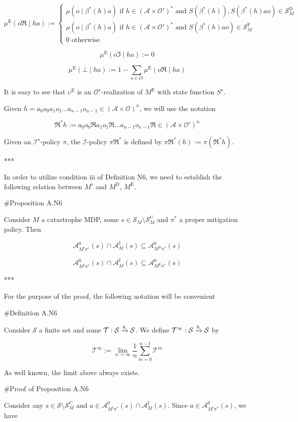 \documentclass[a4paper]{article}
\newcommand{\AP}[1]{\left(#1\right)}
\newcommand{\M}{\xrightarrow{\textnormal{k}}}
\newcommand{\Ob}{\mathcal{O}}
\newcommand{\A}{\mathcal{A}}
\newcommand{\St}{\mathcal{S}}
\newcommand{\T}{\mathcal{T}}
\newcommand{\In}{\mathcal{I}}
\newcommand{\RMC}{\mathrm{C}}
\newcommand{\RMD}{\mathrm{D}}
\newcommand{\RME}{\mathrm{E}}
\newcommand{\RMF}{\mathrm{F}}
\newcommand{\SF}{\St^{\RMF}}
\newcommand{\SD}{\St^{\RMD}}
\newcommand{\SC}{\St^{\RMC}}
\newcommand{\MD}{M^{\RMD}}
\newcommand{\ME}{M^{\RME}}
\begin{document}
$$\mu^\RME(o\Re \mid ha) := \begin{cases} \mu\AP{o \mid \beta^*(h)a} \text{ if } h\in\AP{\A \times \Ob'}^* \text{ and } S\AP{\beta^*(h)},S\AP{\beta^*(h)ao}\in\SD_M \\ \mu\AP{o \mid \beta^*(h)a} \text{ if } h\in\AP{\A \times \Ob'}^* \text{ and } S\AP{\beta^*(h)ao}\in\SF_M \\ 0 \text{ otherwise} \end{cases}$$

$$\mu^\RME(o\Im \mid ha) := 0$$

$$\mu^\RME(\bot \mid ha) := 1 - \sum_{o \in O} \mu^\RME(o\Re \mid ha)$$

It is easy to see that $\upsilon^\RME$ is an $\Ob^\star$-realization of $\ME$ with state function $S^\star$.

Given $h = a_0 o_0 a_1 o_1 \ldots a_{n-1} o_{n-1} \in \AP{\A \times \Ob}^n$, we will use the notation

$$\Re^*h := a_0 o_0 \Re a_1 o_1 \Re \ldots a_{n-1} o_{n-1} \Re \in \AP{\A \times \Ob'}^n$$ 

Given an $\In^\star$-policy $\pi$, the $\In$-policy $\pi\Re^*$ is defined by $\pi\Re^*(h) := \pi\AP{\Re^*h}$.

***

In order to utilize condition iii of Definition N6, we need to establish the following relation between $M^\flat$ and $\MD$, $\ME$.

\#Proposition A.N6

Consider $M$ a catastrophe MDP, some $s \in \St_M \setminus \SC_M$ and $\pi^*$ a proper mitigation policy. Then

$$\A_{M^\flat\pi^*}^0\AP{s} \cap \A_M^\sharp(s) \subseteq \A_{\MD\pi^*}^0\AP{s}$$

$$\A_{M^\flat\pi^*}^0\AP{s} \cap \A_M^\sharp(s) \subseteq \A_{\ME\pi^*}^0\AP{s}$$

***

For the purpose of the proof, the following notation will be convenient

\#Definition A.N6

Consider $\St$ a finite set and some $\T: \St \M \St$. We define $\T^\infty: \St \M \St$ by

$$\T^\infty := \lim_{n \rightarrow \infty} \frac{1}{n} \sum_{m = 0}^{n-1} \T^m$$

As well known, the limit above always exists.

\#Proof of Proposition A.N6

Consider any $s \in \St \setminus \SC_M$ and $a \in \A_{M^\flat\pi^*}^0\AP{s} \cap \A_M^\sharp(s)$. Since $a \in \A_{M^\flat\pi^*}^0\AP{s}$, we have
\end{document}
